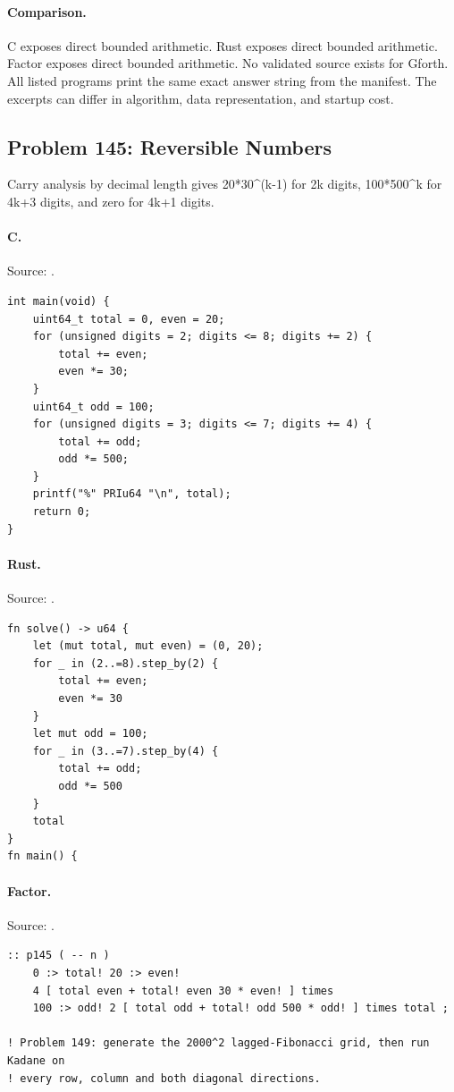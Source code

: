 \paragraph{Comparison.}
C exposes direct bounded arithmetic. Rust exposes direct bounded arithmetic. Factor exposes direct bounded arithmetic.
No validated source exists for Gforth.
All listed programs print the same exact answer string from the manifest. The excerpts can differ in algorithm, data representation, and startup cost.

\subsection{Problem 145: Reversible Numbers}
\label{walkthrough:p145}
Carry analysis by decimal length gives 20*30\textasciicircum{}(k-1) for 2k digits, 100*500\textasciicircum{}k for 4k+3 digits, and zero for 4k+1 digits.

\paragraph{C.} Source: .
\begin{lstlisting}
int main(void) {
    uint64_t total = 0, even = 20;
    for (unsigned digits = 2; digits <= 8; digits += 2) {
        total += even;
        even *= 30;
    }
    uint64_t odd = 100;
    for (unsigned digits = 3; digits <= 7; digits += 4) {
        total += odd;
        odd *= 500;
    }
    printf("%" PRIu64 "\n", total);
    return 0;
}
\end{lstlisting}

\paragraph{Rust.} Source: .
\begin{lstlisting}
fn solve() -> u64 {
    let (mut total, mut even) = (0, 20);
    for _ in (2..=8).step_by(2) {
        total += even;
        even *= 30
    }
    let mut odd = 100;
    for _ in (3..=7).step_by(4) {
        total += odd;
        odd *= 500
    }
    total
}
fn main() {
\end{lstlisting}

\paragraph{Factor.} Source: .
\begin{lstlisting}
:: p145 ( -- n )
    0 :> total! 20 :> even!
    4 [ total even + total! even 30 * even! ] times
    100 :> odd! 2 [ total odd + total! odd 500 * odd! ] times total ;

! Problem 149: generate the 2000^2 lagged-Fibonacci grid, then run Kadane on
! every row, column and both diagonal directions.
\end{lstlisting}

